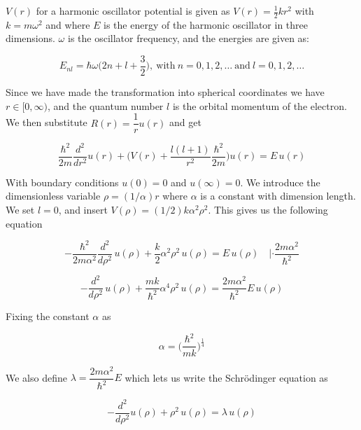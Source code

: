 \documentclass[a4paper, fontsize=11pt]{article}
\begin{document}
$V(r)$ for a harmonic oscillator potential is given as $V(r)=\frac{1}{2}kr^2$ with \\$k=m \omega^2$ and where $E$ is the energy of the harmonic oscillator in three dimensions. $\omega$ is the oscillator frequency, and the energies are given as:

\begin{equation}
E_{nl} = \hbar \omega \Big(2n+l+\frac{3}{2} \Big), \: \text{with} \: n=0,1,2, \hdots \: \text{and} \: l=0,1,2,\hdots
\end{equation}

Since we have made the transformation into spherical coordinates we have $r \in [0, \infty)$, and the quantum number $l$ is the orbital momentum of the electron. We then substitute $R(r)=\dfrac{1}{r}u(r)$ and get

\begin{equation}
\dfrac{\hbar^2}{2m} \dfrac{d^2}{dr^2} u(r) + \Big(V(r) + \dfrac{l(l+1)}{r^2} \dfrac{\hbar^2}{2m}\Big) u(r) = E \, u(r)
\end{equation}

With boundary conditions $u(0)=0$ and $u(\infty)=0$. We introduce the dimensionless variable $\rho = (1/\alpha)r$ where $\alpha$ is a constant with dimension length. We set $l=0$, and insert $V(\rho)=(1/2)k\alpha^2 \rho^2$. This gives us the following equation

\begin{equation}
-\dfrac{\hbar^2}{2m\alpha^2} \dfrac{d^2}{d\rho^2} \, u(\rho) + \dfrac{k}{2} \alpha^2 \rho^2 \, u(\rho) = E \, u(\rho) \quad |\cdot \dfrac{2m\alpha^2}{\hbar^2}
\end{equation}

\begin{equation}
-\dfrac{d^2}{d\rho^2} \, u(\rho) + \dfrac{mk}{\hbar^2} \alpha^4 \rho^2 \, u(\rho) = \dfrac{2m\alpha^2}{\hbar^2} E \, u(\rho) 
\end{equation}

Fixing the constant $\alpha$ as 

\begin{equation}
\alpha=\Big(\dfrac{\hbar^2}{mk}\Big)^{\frac{1}{4}}
\end{equation} 

We also define $\lambda=\dfrac{2m\alpha^2}{\hbar^2}E$ which lets us write the Schr\"{o}dinger equation as

\begin{equation}
-\dfrac{d^2}{d\rho^2}u(\rho) + \rho^2 \, u(\rho) = \lambda \, u(\rho)
\end{equation}
\end{document}
